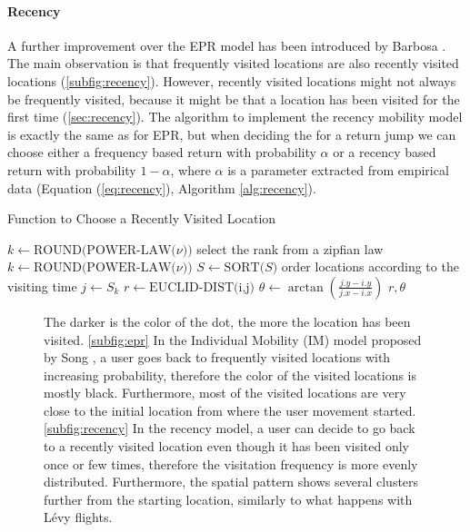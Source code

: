 \paragraph{Recency}
A further improvement over the EPR model has been introduced by Barbosa \et \cite{barbosa_2015_effect}. The main observation is that frequently visited locations are also recently visited locations (\figurename\ref{subfig:recency}). However, recently visited locations might not always be frequently visited, because it might be that a location has been visited for the first time (\sectionname\ref{sec:recency}). The algorithm to implement the recency mobility model is exactly the same as for EPR, but when deciding the for a return jump we can choose either a frequency based return with probability $\alpha$ or a recency based return with probability $1-\alpha$, where $\alpha$ is a parameter extracted from empirical data (Equation (\ref{eq:recency}), Algorithm \ref{alg:recency}).
%
\begin{algorithm}
\caption{Function to Choose a Recently Visited Location}
\label{alg:recency}
\begin{algorithmic}[1]
    \State $k \gets \text{ROUND(POWER-LAW($\nu$))}$ \Comment select the rank from a zipfian law
    	\State $k \gets \text{ROUND(POWER-LAW($\nu$))}$
	\EndWhile
  	\State 	$S \gets \text{SORT($S$)}$ \Comment order locations according to the visiting time
    \State $j \gets S_k$
    \State $r \gets \text{EUCLID-DIST(i,j)}$
    \State $\theta \gets \arctan \left( \frac{j.y - i.y}{j.x - i.x} \right)$
    \State \Return $r,\theta$
\EndFunction
\end{algorithmic}
\end{algorithm}
%
\begin{figure}[htbp]
\centering
\caption{The darker is the color of the dot, the more the location has been visited. \ref{subfig:epr} In the Individual Mobility (IM) model proposed by Song \et, a user goes back to frequently visited locations with increasing probability, therefore the color of the visited locations is mostly black. Furthermore, most of the visited locations are very close to the initial location from where the user movement started. \ref{subfig:recency} In the recency model, a user can decide to go back to a recently visited location even though it has been visited only once or few times, therefore the visitation frequency is more evenly distributed. Furthermore, the spatial pattern shows several clusters further from the starting location, similarly to what happens with L\'evy flights.}
\label{fig:eprre}
\end{figure}


